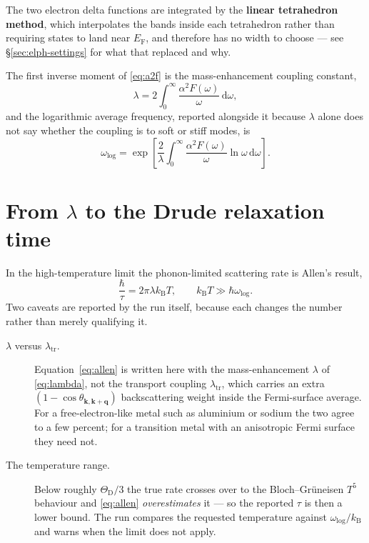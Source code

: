 The two electron delta functions are integrated by the \textbf{linear
tetrahedron method}, which interpolates the bands inside each tetrahedron
rather than requiring states to land near $E_\mathrm{F}$, and therefore has no
width to choose --- see \S\ref{sec:elph-settings} for what that replaced and
why.

The first inverse moment of \eqref{eq:a2f} is the mass-enhancement coupling
constant,
\begin{equation}
  \lambda = 2\int_0^{\infty}
    \frac{\alpha^2F(\omega)}{\omega}\,\mathrm{d}\omega ,
  \label{eq:lambda}
\end{equation}
and the logarithmic average frequency, reported alongside it because $\lambda$
alone does not say whether the coupling is to soft or stiff modes, is
\begin{equation}
  \omega_{\log} = \exp\!\left[
    \frac{2}{\lambda}\int_0^{\infty}
    \frac{\alpha^2F(\omega)}{\omega}\ln\omega \,\mathrm{d}\omega \right] .
\end{equation}

\section{From \texorpdfstring{$\lambda$}{lambda} to the Drude relaxation time}
\label{sec:elph-tau}

In the high-temperature limit the phonon-limited scattering rate is Allen's
result,
\begin{equation}
  \frac{\hbar}{\tau} = 2\pi\lambda k_\mathrm{B}T ,
  \qquad k_\mathrm{B}T \gg \hbar\omega_{\log} .
  \label{eq:allen}
\end{equation}
Two caveats are reported by the run itself, because each changes the number
rather than merely qualifying it.

\begin{description}
  \item[$\lambda$ versus $\lambda_{\mathrm{tr}}$.] Equation~\eqref{eq:allen} is
    written here with the mass-enhancement $\lambda$ of \eqref{eq:lambda}, not
    the transport coupling $\lambda_{\mathrm{tr}}$, which carries an extra
    $(1-\cos\theta_{\mathbf{k},\mathbf{k}+\mathbf{q}})$ backscattering weight
    inside the Fermi-surface average. For a free-electron-like metal such as
    aluminium or sodium the two agree to a few percent; for a transition metal
    with an anisotropic Fermi surface they need not.
  \item[The temperature range.] Below roughly $\Theta_\mathrm{D}/3$ the true
    rate crosses over to the Bloch--Gr\"uneisen $T^5$ behaviour and
    \eqref{eq:allen} \emph{overestimates} it --- so the reported $\tau$ is then
    a lower bound. The run compares the requested temperature against
    $\omega_{\log}/k_\mathrm{B}$ and warns when the limit does not apply.
\end{description}


